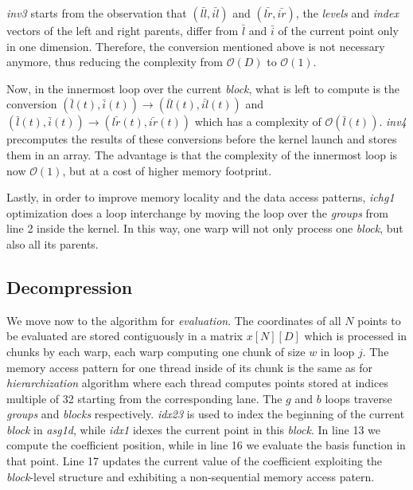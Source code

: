\textit{inv3} starts from the observation that $(\bar{ll}, \bar{il})$ and
$(\bar{lr}, \bar{ir})$, the \textit{levels} and \textit{index} vectors of the
left and right parents, differ from $\bar{l}$ and $\bar{i}$ of the current point
only in one dimension. Therefore, the conversion mentioned above is not
necessary anymore, thus reducing the complexity from $\mathcal{O}(D)$ to
$\mathcal{O}(1)$.

Now, in the innermost loop over the current \textit{block}, what is left to
compute is the conversion $(\bar{l}(t), \bar{i}(t)) \rightarrow (\bar{ll}(t),
\bar{il}(t))$ and $(\bar{l}(t), \bar{i}(t)) \rightarrow (\bar{lr}(t),
\bar{ir}(t))$ which has a complexity of $\mathcal{O}(\bar{l}(t))$.
\textit{inv4} precomputes the results of these conversions before the kernel
launch and stores them in an array. The advantage is that the complexity of the
innermost loop is now $\mathcal{O}(1)$, but at a cost of higher memory
footprint.

Lastly, in order to improve memory locality and the data access patterns,
\textit{ichg1} optimization does a loop interchange by moving the loop over the
\textit{groups} from line 2 inside the kernel. In this way, one warp will not
only process one \textit{block}, but also all its parents.

\subsection{Decompression}

We move now to the algorithm for \textit{evaluation}. The coordinates of all $N$
points to be evaluated are stored contiguously in a matrix $x[N][D]$ which is
processed in chunks by each warp, each warp computing one chunk of size $w$ in
loop $j$. The memory access pattern for one thread inside of its chunk is the
same as for \textit{hierarchization} algorithm where each thread computes points
stored at indices multiple of 32 starting from the corresponding lane. The $g$
and $b$ loops traverse \textit{groups} and \textit{blocks} respectively.
\textit{idx23} is used to index the beginning of the current \textit{block} in
\textit{asg1d}, while \textit{idx1} idexes the current point in this
\textit{block}. In line 13 we compute the coefficient position, while in line 16
we evaluate the basis function in that point. Line 17 updates the current value
of the coefficient exploiting the \textit{block}-level structure and exhibiting
a non-sequential memory access patern.

